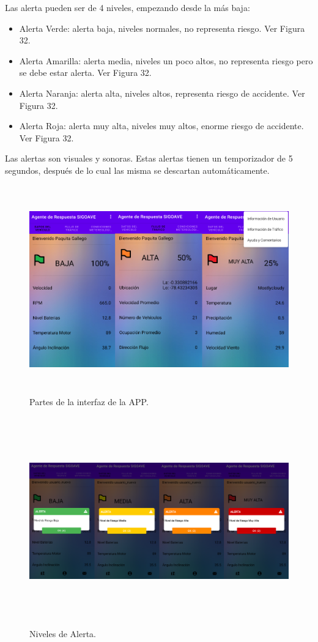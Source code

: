 \documentclass[a4paper,10pt, oneside, titlepage]{article}
\begin{document}
	Las alerta pueden ser de 4 niveles, empezando desde la más baja:
	\begin{itemize}
		\item Alerta Verde: alerta baja, niveles normales, no representa riesgo. Ver Figura 32.
		\item Alerta Amarilla: alerta media, niveles un poco altos, no representa riesgo pero se debe estar alerta. Ver Figura 32.
		\item Alerta Naranja: alerta alta, niveles altos, representa riesgo de accidente. Ver Figura 32.
		\item Alerta Roja: alerta muy alta, niveles muy altos, enorme riesgo de accidente. Ver Figura 32.
	\end{itemize}
	Las alertas son visuales y sonoras. Estas alertas tienen un temporizador de 5 segundos, después de lo cual las misma se descartan automáticamente.
	\begin{figure}[!ht]
		\centering
		\includegraphics[width = 1\linewidth, height = 9cm]{31.png}
		\caption{Partes de la interfaz de la APP.}
	\end{figure}
	\begin{figure}[!ht]
		\centering
		\includegraphics[width = 1\linewidth, height = 9cm]{32.png}
		\caption{Niveles de Alerta.}
	\end{figure}
	
\end{document}
